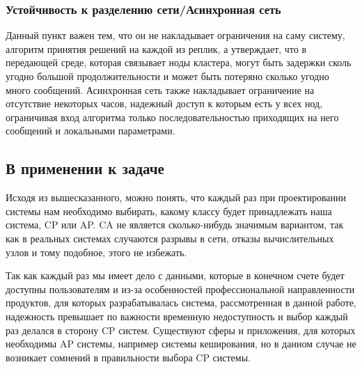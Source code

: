 \subsubsection{Устойчивость к разделению сети/Асинхронная сеть}

Данный пункт важен тем, что он не накладывает ограничения на саму систему, алгоритм принятия решений на каждой из реплик, а утверждает, что в передающей среде, которая связывает ноды кластера, могут быть задержки сколь угодно большой продолжительности и может быть потеряно сколько угодно много сообщений. Асинхронная сеть также накладывает ограничение на отсутствие некоторых часов, надежный доступ к которым есть у всех нод, ограничивая вход алгоритма только последовательностью приходящих на него сообщений и локальными параметрами.

\subsection{В применении к задаче}

Исходя из вышесказанного, можно понять, что каждый раз при проектировании системы нам необходимо выбирать, какому классу будет принадлежать наша система, CP или AP. CA не является сколько-нибудь значимым вариантом, так как в реальных системах случаются разрывы в сети, отказы вычислительных узлов и тому подобное, этого не избежать.

Так как каждый раз мы имеет дело с данными, которые в конечном счете будет доступны пользователям и из-за особенностей профессиональной направленности продуктов, для которых разрабатывалась система, рассмотренная в данной работе, надежность превышает по важности временную недоступность и выбор каждый раз делался в сторону CP систем. Существуют сферы и приложения, для которых необходимы AP системы, например системы кеширования, но в данном случае не возникает сомнений в правильности выбора CP системы.

\clearpage
